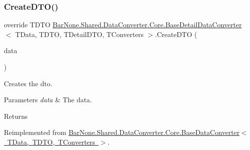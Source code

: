 \subsubsection{\texorpdfstring{Create\+D\+T\+O()}{CreateDTO()}}
{\footnotesize\ttfamily override T\+D\+TO \mbox{\hyperlink{class_bar_none_1_1_shared_1_1_data_converter_1_1_core_1_1_base_detail_data_converter}{Bar\+None.\+Shared.\+Data\+Converter.\+Core.\+Base\+Detail\+Data\+Converter}}$<$ T\+Data, T\+D\+TO, T\+Detail\+D\+TO, T\+Converters $>$.Create\+D\+TO (\begin{DoxyParamCaption}\item[{T\+Data}]{data }\end{DoxyParamCaption})\hspace{0.3cm}{\ttfamily [virtual]}}



Creates the dto. 


\begin{DoxyParams}{Parameters}
{\em data} & The data.\\
\hline
\end{DoxyParams}
\begin{DoxyReturn}{Returns}

\end{DoxyReturn}


Reimplemented from \mbox{\hyperlink{class_bar_none_1_1_shared_1_1_data_converter_1_1_core_1_1_base_data_converter_afdcc049c759d824f4954a6be3e862482}{Bar\+None.\+Shared.\+Data\+Converter.\+Core.\+Base\+Data\+Converter$<$ T\+Data, T\+D\+T\+O, T\+Converters $>$}}.

\mbox{\label{class_bar_none_1_1_shared_1_1_data_converter_1_1_core_1_1_base_detail_data_converter_a1164049c7b282195e4e9c9d2ecaaac58}} 
